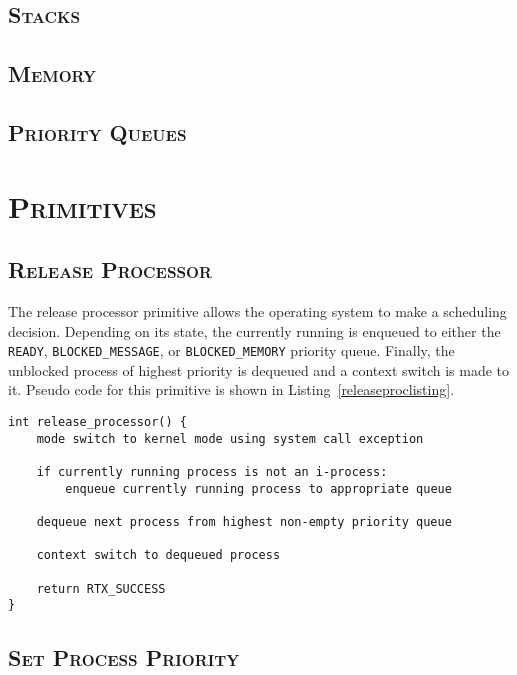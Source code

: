 \documentclass[oneside]{report}
\begin{document}
\subsection{\textsc{Stacks}}

\subsection{\textsc{Memory}}
\label{sec:mem_management}

\subsection{\textsc{Priority Queues}}

\section{\textsc{Primitives}}

\subsection{\textsc{Release Processor}}
The release processor primitive allows the operating system to make a
scheduling decision. Depending on its state, the currently running is
enqueued to either the \texttt{READY}, \texttt{BLOCKED\_MESSAGE}, or
\texttt{BLOCKED\_MEMORY} priority queue. Finally, the unblocked process
of highest priority is dequeued and a context switch is made to it. Pseudo code 
for this primitive is shown in Listing~\ref{releaseproclisting}.

\begin{lstlisting}
int release_processor() {
    mode switch to kernel mode using system call exception

    if currently running process is not an i-process:
        enqueue currently running process to appropriate queue

    dequeue next process from highest non-empty priority queue

    context switch to dequeued process
    
    return RTX_SUCCESS
}
\end{lstlisting}

\subsection{\textsc{Set Process Priority}}
\end{document}
